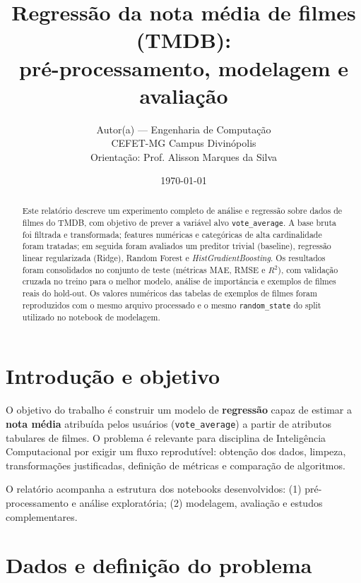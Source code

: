 \documentclass[11pt,a4paper]{article}
\title{\textbf{Regressão da nota média de filmes (TMDB):\\pré-processamento, modelagem e avaliação}}
\author{Autor(a) --- Engenharia de Computação\\CEFET-MG Campus Divinópolis\\Orientação: Prof. Alisson Marques da Silva}
\date{\today}
\begin{document}
\maketitle

\begin{abstract}
Este relatório descreve um experimento completo de análise e regressão sobre dados de filmes do TMDB, com objetivo de prever a variável alvo \texttt{vote\_average}. A base bruta foi filtrada e transformada; features numéricas e categóricas de alta cardinalidade foram tratadas; em seguida foram avaliados um preditor trivial (baseline), regressão linear regularizada (Ridge), Random Forest e \emph{HistGradientBoosting}. Os resultados foram consolidados no conjunto de teste (métricas MAE, RMSE e $R^2$), com validação cruzada no treino para o melhor modelo, análise de importância e exemplos de filmes reais do hold-out. Os valores numéricos das tabelas de exemplos de filmes foram reproduzidos com o mesmo arquivo processado e o mesmo \texttt{random\_state} do split utilizado no notebook de modelagem.
\end{abstract}

\tableofcontents
\newpage

\section{Introdução e objetivo}

O objetivo do trabalho é construir um modelo de \textbf{regressão} capaz de estimar a \textbf{nota média} atribuída pelos usuários (\texttt{vote\_average}) a partir de atributos tabulares de filmes. O problema é relevante para disciplina de Inteligência Computacional por exigir um fluxo reprodutível: obtenção dos dados, limpeza, transformações justificadas, definição de métricas e comparação de algoritmos.

O relatório acompanha a estrutura dos notebooks desenvolvidos: (1) pré-processamento e análise exploratória; (2) modelagem, avaliação e estudos complementares.

\section{Dados e definição do problema}
\end{document}
